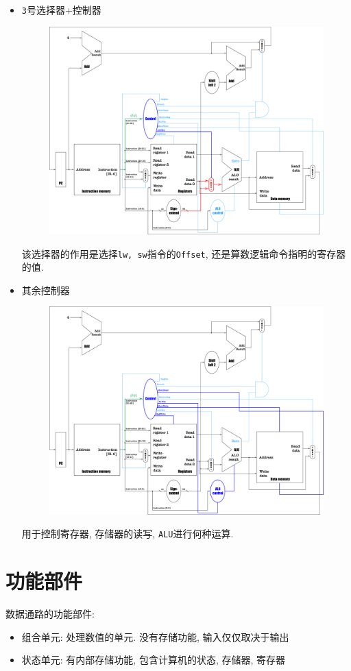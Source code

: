 \begin{itemize}
\item \verb|3|号选择器+控制器
\begin{figure}[H]
\centering
\includegraphics[scale=.2]{img/figure34.pdf}
\end{figure}
该选择器的作用是选择\verb|lw, sw|指令的\verb|Offset|, 还是算数逻辑命令指明的寄存器的值.
\item 其余控制器
\begin{figure}[H]
\centering
\includegraphics[scale=.2]{img/figure35.pdf}
\end{figure}
用于控制寄存器, 存储器的读写, \verb|ALU|进行何种运算.
\end{itemize}
\section{功能部件}
数据通路的功能部件:
\begin{itemize}
\item 组合单元: 处理数值的单元. 没有存储功能, 输入仅仅取决于输出
\item 状态单元: 有内部存储功能, 包含计算机的状态, 存储器, 寄存器
\end{itemize}

